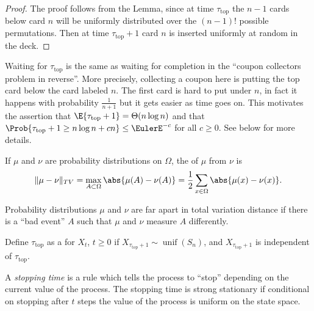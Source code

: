 \documentclass[12pt]{article}
\begin{document}
\begin{proof}
    The proof follows from the Lemma, since at time \( \tau_{\text{top}}
    \) the \( n-1 \) cards below card \( n \) will be uniformly
    distributed over the \( (n-1)! \) possible permutations.  Then at
    time \( \tau_{\text {top}}+ 1 \) card \( n \) is inserted uniformly
    at random in the deck.
\end{proof}

\begin{remark}
    Waiting for \( \tau_{\text{top}} \) is the same as waiting for
    completion in the ``coupon collectors problem in reverse''.  More
    precisely, collecting a coupon here is putting the top card below
    the card labeled \( n \).  The first card is hard to put under \( n \),
    in fact it happens with probability \( \frac{1}{n+1} \) but it gets
    easier as time goes on.  This motivates the assertion that \( \E{\tau_
    {\text{top}} + 1} = \Theta(n \log n) \) and that \( \Prob{\tau_{\text
    {top}}+1 \ge n \log n + c n} \le \EulerE^{-c} \) for all \( c \ge 0 \).
    See below for more details.
\end{remark}

\begin{definition}
    If \( \mu \) and \( \nu \) are probability distributions on \(
    \Omega \), the  of \( \mu \) from \(
    \nu \) is%
    \[
        \| \mu - \nu \|_{TV} = \max_{A \subset \Omega} \abs{ \mu(A) -
        \nu(A)} = \frac{1}{2} \sum\limits_{x \in \Omega} \abs{ \mu(x) -
        \nu(x)}.
    \]
\end{definition}

\begin{remark}
    Probability distributions \( \mu \) and \( \nu \) are far apart in
    total variation distance if there is a ``bad event'' \( A \) such
    that \( \mu \) and \( \nu \) measure \( A \) differently.
\end{remark}

\begin{definition}
    Define \( \tau_{\text{top}} \) as a %
    for \( X_t \), \( t \ge 0 \) if \( X_{\tau_{\text{top}}+1} \sim
    \operatorname{unif}
    (S_n) \), and \( X_{\tau_{\text{top}}+1} \) is independent of \(
    \tau_{\text{top}} \).
\end{definition}

\begin{remark}
    A \emph{stopping time} is a rule which tells the process to ``stop''
    depending on the current value of the process.  The stopping time is
    strong stationary if conditional on stopping after \( t \) steps the
    value of the process is uniform on the state space.
\end{remark}
\end{document}

